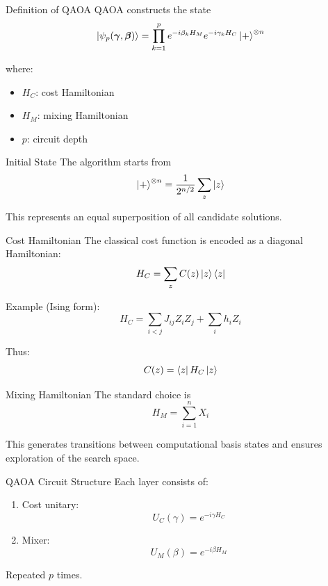 \documentclass{beamer}
\begin{document}
\begin{frame}{Definition of QAOA}
QAOA constructs the state
\[
\ket{\psi_p(\boldsymbol{\gamma}, \boldsymbol{\beta})}
=
\prod_{k=1}^p
e^{-i \beta_k H_M}
e^{-i \gamma_k H_C}
\ket{+}^{\otimes n}
\]

where:
\begin{itemize}
\item \(H_C\): cost Hamiltonian
\item \(H_M\): mixing Hamiltonian
\item \(p\): circuit depth
\end{itemize}
\end{frame}

\begin{frame}{Initial State}
The algorithm starts from
\[
\ket{+}^{\otimes n}
=
\frac{1}{2^{n/2}} \sum_z \ket{z}
\]

This represents an equal superposition of all candidate solutions.
\end{frame}

\begin{frame}{Cost Hamiltonian}
The classical cost function is encoded as a diagonal Hamiltonian:
\[
H_C = \sum_z C(z) \ket{z}\bra{z}
\]

Example (Ising form):
\[
H_C = \sum_{i<j} J_{ij} Z_i Z_j + \sum_i h_i Z_i
\]

Thus:
\[
C(z) = \bra{z} H_C \ket{z}
\]
\end{frame}

\begin{frame}{Mixing Hamiltonian}
The standard choice is
\[
H_M = \sum_{i=1}^n X_i
\]

This generates transitions between computational basis states and ensures exploration of the search space.
\end{frame}

\begin{frame}{QAOA Circuit Structure}
Each layer consists of:
\begin{enumerate}
\item Cost unitary:
\[
U_C(\gamma) = e^{-i \gamma H_C}
\]
\item Mixer:
\[
U_M(\beta) = e^{-i \beta H_M}
\]
\end{enumerate}

Repeated \(p\) times.
\end{frame}
\end{document}
